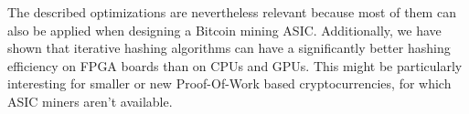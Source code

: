 The described optimizations are nevertheless relevant because most of them can also be applied when designing a Bitcoin mining ASIC. Additionally, we have shown that iterative hashing algorithms can have a significantly better hashing efficiency on FPGA boards than on CPUs and GPUs. This might be particularly interesting for smaller or new Proof-Of-Work based cryptocurrencies, for which ASIC miners aren't available.